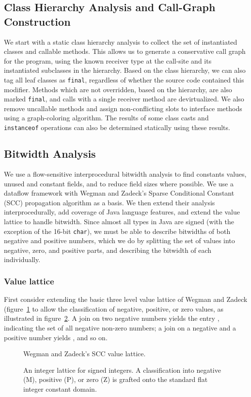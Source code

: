 \documentclass[preprint]{acmconf}
\newcommand{\figscale}{1.0}
\begin{document}
\subsection{Class Hierarchy Analysis and Call-Graph Construction}
We start with a static class hierarchy analysis to collect the set of
instantiated classes and callable methods.  This allows us to generate
a conservative call graph for the program, using the known receiver
type at the call-site and its instantiated subclasses in the
hierarchy.  Based on the class hierarchy, we can also tag all leaf
classes as {\tt final}, regardless of whether the source code contained
this modifier.  Methods which are not overridden, based on
the hierarchy, are also marked {\tt final}, and calls with a single
receiver method are devirtualized.  We also remove uncallable methods
and assign non-conflicting slots to interface methods using a
graph-coloring algorithm.  The results of some class casts and {\tt
  instanceof} operations can also be determined statically using
these results.

\subsection{Bitwidth Analysis}
We use a flow-sensitive interprocedural bitwidth analysis to
find constants values, unused and constant fields, and to reduce
field sizes where possible.  We use a dataflow framework with
Wegman and Zadeck's Sparse Conditional Constant (SCC) propagation
algorithm \cite{wegman91:scc} as a basis.  We then extend their
analysis interprocedurally, add coverage of Java language features,
and extend the value lattice to handle bitwidth.
Since almost all types in Java are signed (with the exception of the
16-bit {\tt char}), we must be able to describe bitwidths of both
negative and positive numbers, which we do by splitting the set of
values into negative, zero, and positive parts, and describing the
bitwidth of each individually.

\subsubsection{Value lattice}
First consider extending the basic three level value lattice of Wegman and
Zadeck (figure~\ref{fig:wzlat} to allow the classification of
negative, positive, or zero
values, as illustrated in figure~\ref{fig:scclat6}.
A join on two negative numbers yields the entry ,
indicating the set of all negative non-zero numbers; a
join on a negative and a positive number yields , and so on.
\begin{figure}
\centering\renewcommand{\figscale}{0.6}
\caption{Wegman and Zadeck's SCC value lattice.}
\label{fig:wzlat}
\end{figure}
\begin{figure}
\centering\renewcommand{\figscale}{0.6}
\caption[An integer lattice for signed integers.]
{An integer lattice for signed integers. A classification into
negative (M), positive (P), or zero (Z) is grafted onto the standard
flat integer constant domain.}
\label{fig:scclat6}
\end{figure}
\end{document}
